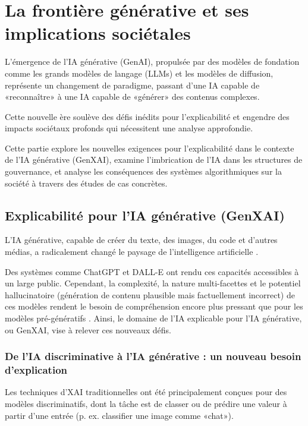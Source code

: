 \part{La frontière générative et ses implications sociétales}
L'émergence de l'IA générative (GenAI), propulsée par des modèles de fondation comme les grands modèles de langage (LLMs) et les modèles de diffusion, représente un changement de paradigme, passant d'une IA capable de «reconnaître» à une IA capable de «générer» des contenus complexes.

Cette nouvelle ère soulève des défis inédits pour l'explicabilité et engendre des impacts sociétaux profonds qui nécessitent une analyse approfondie.

Cette partie explore les nouvelles exigences pour l'explicabilité dans le contexte de l'IA générative (GenXAI), examine l'imbrication de l'IA dans les structures de gouvernance, et analyse les conséquences des systèmes algorithmiques sur la société à travers des études de cas concrètes.
\vspace{2em}

\chapter{Explicabilité pour l'IA générative (GenXAI)}
L'IA générative, capable de créer du texte, des images, du code et d'autres médias, a radicalement changé le paysage de l'intelligence artificielle \citep{Gozalo-Brizuela2024A, Cao2025A}.

Des systèmes comme ChatGPT \citet{Achiam2024Gpt4} et DALL-E \citet{Betker2024Improving} ont rendu ces capacités accessibles à un large public. Cependant, la complexité, la nature multi-facettes et le potentiel hallucinatoire (génération de contenu plausible mais factuellement incorrect) de ces modèles rendent le besoin de compréhension encore plus pressant que pour les modèles pré-génératifs \citet{Schneider2024Explainable}. Ainsi, le domaine de l'IA explicable pour l'IA générative, ou GenXAI, vise à relever ces nouveaux défis.
\section{De l'IA discriminative à l'IA générative : un nouveau besoin d'explication}
Les techniques d'XAI traditionnelles ont été principalement conçues pour des modèles discriminatifs, dont la tâche est de classer ou de prédire une valeur à partir d'une entrée (p. ex. classifier une image comme «chat»). 

